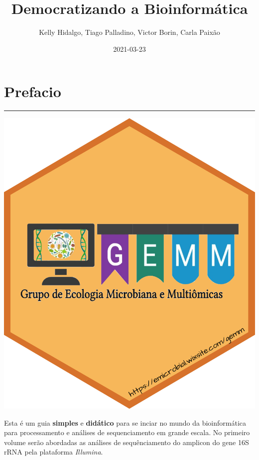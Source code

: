 \documentclass[
]{book}
\title{ Democratizando a Bioinformática}
\author{Kelly Hidalgo, Tiago Palladino, Victor Borin, Carla Paixão}
\date{2021-03-23}
\begin{document}
\maketitle

{
\setcounter{tocdepth}{1}
\tableofcontents
}
\hypertarget{prefacio}{%
\chapter*{Prefacio}\label{prefacio}}

\begin{center}\rule{0.5\linewidth}{0.5pt}\end{center}

\begin{center}\includegraphics[width=1.2\linewidth,height=1.2\textheight]{imgs/1} \end{center}

Esta é um guia \textbf{simples} e \textbf{didático} para se inciar no mundo da bioinformática para processamento e análises de sequenciamento em grande escala. No primeiro volume serão abordadas as análises de sequênciamento do amplicon do gene 16S rRNA pela plataforma \emph{Illumina}.
\end{document}
